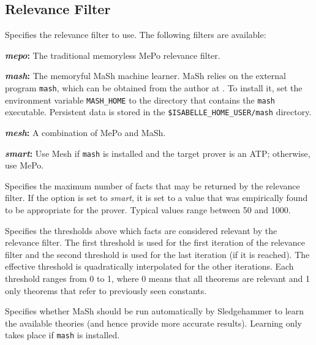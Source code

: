 \documentclass[a4paper,12pt]{article}
\begin{document}
\subsection{Relevance Filter}
\label{relevance-filter}

\begin{enum}
Specifies the relevance filter to use. The following filters are available:

\begin{enum}
\item[\labelitemi] \textbf{\textit{mepo}:}
The traditional memoryless MePo relevance filter.

\item[\labelitemi] \textbf{\textit{mash}:}
The memoryful MaSh machine learner. MaSh relies on the external program
\texttt{mash}, which can be obtained from the author at \authoremail. To install
it, set the environment variable \texttt{MASH\_HOME} to the directory that
contains the \texttt{mash} executable.
Persistent data is stored in the \texttt{\$ISABELLE\_HOME\_USER/mash} directory.

\item[\labelitemi] \textbf{\textit{mesh}:} A combination of MePo and MaSh.

\item[\labelitemi] \textbf{\textit{smart}:} Use Mesh if \texttt{mash} is
installed and the target prover is an ATP; otherwise, use MePo.
\end{enum}

Specifies the maximum number of facts that may be returned by the relevance
filter. If the option is set to \textit{smart}, it is set to a value that was
empirically found to be appropriate for the prover. Typical values range between
50 and 1000.

Specifies the thresholds above which facts are considered relevant by the
relevance filter. The first threshold is used for the first iteration of the
relevance filter and the second threshold is used for the last iteration (if it
is reached). The effective threshold is quadratically interpolated for the other
iterations. Each threshold ranges from 0 to 1, where 0 means that all theorems
are relevant and 1 only theorems that refer to previously seen constants.

Specifies whether MaSh should be run automatically by Sledgehammer to learn the
available theories (and hence provide more accurate results). Learning only
takes place if \texttt{mash} is installed.


\end{enum}
\end{document}
